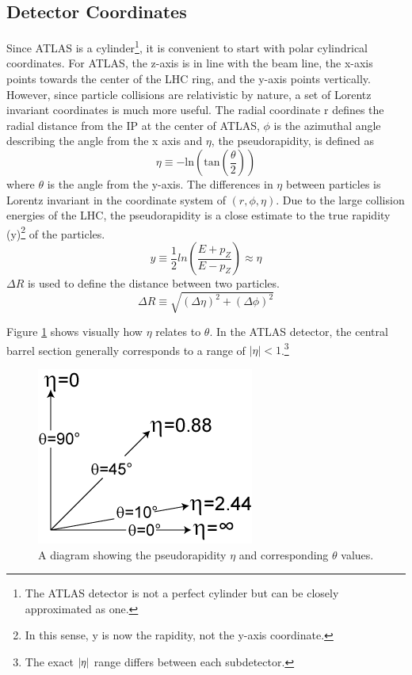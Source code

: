 	\subsection{Detector Coordinates}\label{ssec:coordinates}
		Since \gls{ATLAS} is a cylinder\footnote{The \gls{ATLAS} detector is not a perfect cylinder but can be closely approximated as one.}, it is convenient to start with polar cylindrical coordinates. For \gls{ATLAS}, the z-axis is in line with the beam line, the x-axis points towards the center of the \gls{LHC} ring, and the y-axis points vertically. However, since particle collisions are relativistic by nature, a set of Lorentz invariant coordinates is much more useful. The radial coordinate r defines the radial distance from the \gls{IP} at the center of \gls{ATLAS}, $\phi$ is the azimuthal angle describing the angle from the x axis and $\eta$, the pseudorapidity, is defined as 
		\begin{equation}\label{eqn:eta}
		\eta \equiv - \mathrm{ln}(\mathrm{tan}(\frac{\theta}{2}))
		\end{equation}
		where $\theta$ is the angle from the y-axis. The differences in $\eta$ between particles is Lorentz invariant in the coordinate system of $(r,\phi,\eta)$. Due to the large collision energies of the \gls{LHC}, the pseudorapidity is a close estimate to the true rapidity (y)\footnote{In this sense, y is now the rapidity, not the y-axis coordinate.} of the particles. 
		\begin{equation}\label{eqn:rapidity}
		y \equiv \frac{1}{2} ln(\frac{E+p_Z}{E-p_Z}) \approx \eta
		\end{equation}
		$\Delta R$ is used to define the distance between two particles.
		\begin{equation}\label{eqn:dR}
		\Delta R \equiv \sqrt{ (\Delta \eta)^2 + (\Delta \phi)^2}
		\end{equation}

		Figure \ref{fig:pseudorapidity} shows visually how $\eta$ relates to $\theta$. In the \gls{ATLAS} detector, the central barrel section generally corresponds to a range of $|\eta|<1$.\footnote{The exact $|{\eta}|$ range differs between each subdetector.} 

		\begin{figure}[!ht]
		\centering
		\includegraphics[width=.25\textwidth,keepaspectratio=true]{chapters/chapter3_experiment/images/Pseudorapidity.png}
		\caption{ A diagram showing the pseudorapidity $\eta$ and corresponding $\theta$ values. \cite{pseudorapidity} }
		\label{fig:pseudorapidity}
		\end{figure}

